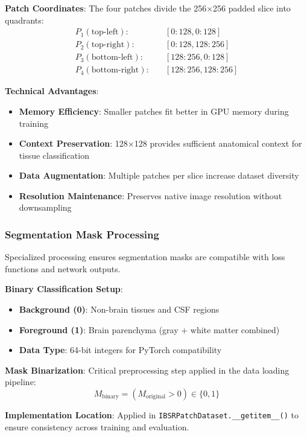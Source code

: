 \documentclass[12pt,a4paper]{article}
\begin{document}
\textbf{Patch Coordinates}:
The four patches divide the 256×256 padded slice into quadrants:
\begin{align}
P_1 (\text{top-left}): & \quad [0:128, 0:128] \\
P_2 (\text{top-right}): & \quad [0:128, 128:256] \\
P_3 (\text{bottom-left}): & \quad [128:256, 0:128] \\
P_4 (\text{bottom-right}): & \quad [128:256, 128:256]
\end{align}

\textbf{Technical Advantages}:
\begin{itemize}
    \item \textbf{Memory Efficiency}: Smaller patches fit better in GPU memory during training
    \item \textbf{Context Preservation}: 128×128 provides sufficient anatomical context for tissue classification
    \item \textbf{Data Augmentation}: Multiple patches per slice increase dataset diversity
    \item \textbf{Resolution Maintenance}: Preserves native image resolution without downsampling
\end{itemize}

\subsubsection{Segmentation Mask Processing}

Specialized processing ensures segmentation masks are compatible with loss functions and network outputs.

\textbf{Binary Classification Setup}:
\begin{itemize}
    \item \textbf{Background (0)}: Non-brain tissues and CSF regions
    \item \textbf{Foreground (1)}: Brain parenchyma (gray + white matter combined)
    \item \textbf{Data Type}: 64-bit integers for PyTorch compatibility
\end{itemize}

\textbf{Mask Binarization}:
Critical preprocessing step applied in the data loading pipeline:
\begin{equation}
M_{\text{binary}} = (M_{\text{original}} > 0) \in \{0, 1\}
\end{equation}

\textbf{Implementation Location}:
Applied in \verb|IBSRPatchDataset.__getitem__()| to ensure consistency across training and evaluation.
\end{document}
